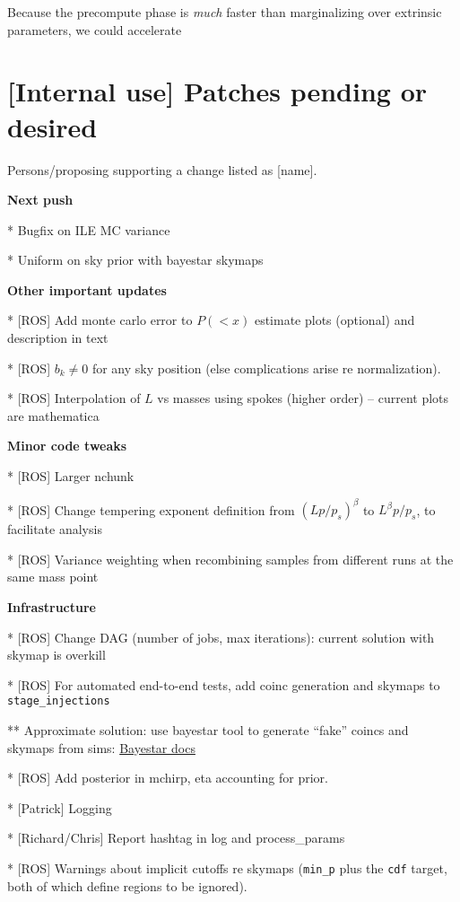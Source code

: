 Because the precompute phase is \emph{much} faster than marginalizing over extrinsic parameters, we could accelerate

\section{[Internal use] Patches pending or desired}

Persons/proposing supporting  a change listed as [name].

\noindent \textbf{Next push}

* Bugfix on ILE MC variance

* Uniform on sky prior with bayestar skymaps

\noindent \textbf{Other important updates}

* [ROS] Add monte carlo error to $P(<x)$ estimate plots (optional) and description in text

*  [ROS]  $b_k \ne 0$ for any sky position (else complications arise re normalization).

* [ROS] Interpolation of $L$ vs masses using spokes (higher order) -- current plots are mathematica

\noindent \textbf{Minor code tweaks}

* [ROS] Larger nchunk

* [ROS] Change tempering exponent definition from $(Lp/p_s)^\beta$ to $L^\beta p/p_s$, to facilitate analysis

* [ROS] Variance weighting when recombining samples from different runs at the same mass point


\noindent \textbf{Infrastructure}

* [ROS] Change DAG (number of jobs, max iterations): current solution with skymap is overkill


* [ROS] For automated end-to-end tests, add \gstlal{} coinc generation and \BS{} skymaps to \texttt{stage\_injections}

** Approximate solution: use bayestar tool to generate ``fake'' coincs and skymaps from sims:
\href{https://www.lsc-group.phys.uwm.edu/ligovirgo/cbcnote/ParameterEstimationModelSelection/BAYESTARHowTo}{Bayestar docs}

* [ROS] Add posterior in mchirp, eta accounting for prior.

* [Patrick] Logging

* [Richard/Chris] Report hashtag in log and process\_params

* [ROS] Warnings about implicit cutoffs re skymaps (\texttt{min\_p} plus the \texttt{cdf} target, both of which define
regions to be ignored).



